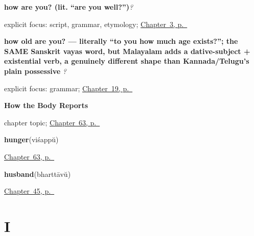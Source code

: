 \noindent\begin{minipage}[t]{\linewidth}
\raggedright
\textbf{how are you? (lit. \textquotedblleft{}are you well?\textquotedblright{})}\enspace\emph{?}\par
\footnotesize explicit focus: script, grammar, etymology; \hyperref[ch:responding]{Chapter~3, p.~\pageref*{ch:responding}}
\end{minipage}\par\smallskip

\noindent\begin{minipage}[t]{\linewidth}
\raggedright
\textbf{how old are you? — literally \textquotedblleft{}to you how much age exists?\textquotedblright{}; the SAME Sanskrit vayas word, but Malayalam adds a dative-subject + existential verb, a genuinely different shape than Kannada/Telugu's plain possessive}\enspace\emph{  ?}\par
\footnotesize explicit focus: grammar; \hyperref[ch:ml-asking-age]{Chapter~19, p.~\pageref*{ch:ml-asking-age}}
\end{minipage}\par\smallskip

\noindent\begin{minipage}[t]{\linewidth}
\raggedright
\textbf{How the Body Reports}\par
\footnotesize chapter topic; \hyperref[ch:ml-how-the-body-reports]{Chapter~63, p.~\pageref*{ch:ml-how-the-body-reports}}
\end{minipage}\par\smallskip

\noindent\begin{minipage}[t]{\linewidth}
\raggedright
\textbf{hunger}\enspace\emph{}\enspace(viśappŭ)\par
\footnotesize \hyperref[ch:ml-how-the-body-reports]{Chapter~63, p.~\pageref*{ch:ml-how-the-body-reports}}
\end{minipage}\par\smallskip

\noindent\begin{minipage}[t]{\linewidth}
\raggedright
\textbf{husband}\enspace\emph{}\enspace(bharttāvŭ)\par
\footnotesize \hyperref[ch:ml-grandparents]{Chapter~45, p.~\pageref*{ch:ml-grandparents}}
\end{minipage}\par\smallskip

\section*{I}

